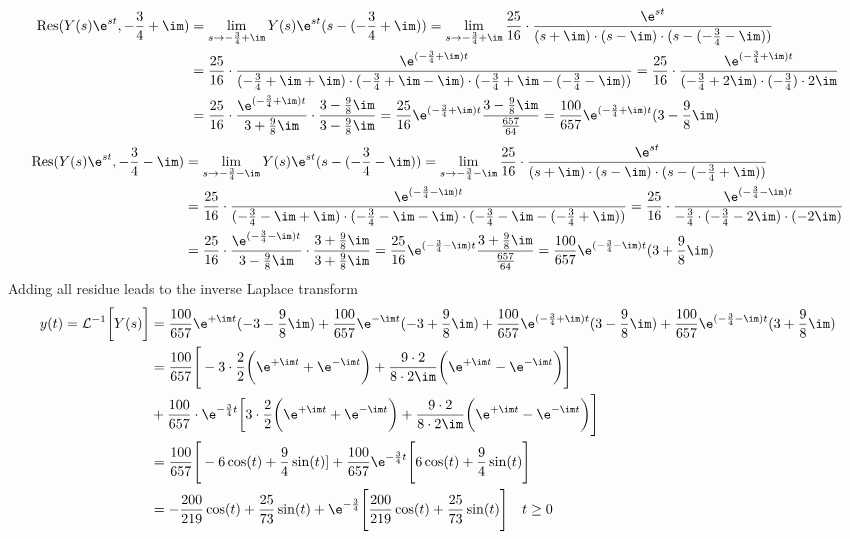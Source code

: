 \begin{align}
	\mathrm{Res}(Y(s)\e^{st},-\frac{3}{4}+\im)&=\lim\limits_{s\rightarrow-\frac{3}{4}+\im}Y(s)\e^{st}(s-(-\frac{3}{4}+\im))=\lim\limits_{s \rightarrow -\frac{3}{4}+\im}\frac{25}{16}\cdot\frac{\e^{st}}{(s+\im)\cdot(s-\im)\cdot(s-(-\frac{3}{4}-\im))} \nonumber \\
	&= \frac{25}{16}\cdot\frac{\e^{(-\frac{3}{4}+\im)t}}{(-\frac{3}{4}+\im+\im)\cdot(-\frac{3}{4}+\im-\im)\cdot(-\frac{3}{4}+\im-(-\frac{3}{4}-\im))}=\frac{25}{16}\cdot\frac{\e^{(-\frac{3}{4}+\im)t}}{(-\frac{3}{4}+2\im)\cdot(-\frac{3}{4})\cdot2\im} \nonumber \\
	&=\frac{25}{16}\cdot\frac{\e^{(-\frac{3}{4}+\im)t}}{3+\frac{9}{8}\im}\cdot\frac{3-\frac{9}{8}\im}{3-\frac{9}{8}\im}=\frac{25}{16}\e^{(-\frac{3}{4}+\im)t}\frac{3-\frac{9}{8}\im}{\frac{657}{64}}= \frac{100}{657}\e^{(-\frac{3}{4}+\im)t}(3-\frac{9}{8}\im)
\end{align}
\begin{align}
	\mathrm{Res}(Y(s)\e^{st},-\frac{3}{4}-\im)&=\lim\limits_{s\rightarrow-\frac{3}{4}-\im}Y(s)\e^{st}(s-(-\frac{3}{4}-\im))=\lim\limits_{s \rightarrow -\frac{3}{4}-\im}\frac{25}{16}\cdot\frac{\e^{st}}{(s+\im)\cdot(s-\im)\cdot(s-(-\frac{3}{4}+\im))} \nonumber \\
	&= \frac{25}{16}\cdot\frac{\e^{(-\frac{3}{4}-\im)t}}{(-\frac{3}{4}-\im+\im)\cdot(-\frac{3}{4}-\im-\im)\cdot(-\frac{3}{4}-\im-(-\frac{3}{4}+\im))}=\frac{25}{16}\cdot\frac{\e^{(-\frac{3}{4}-\im)t}}{-\frac{3}{4}\cdot(-\frac{3}{4}-2\im)\cdot(-2\im)} \nonumber \\
	&=\frac{25}{16}\cdot\frac{\e^{(-\frac{3}{4}-\im)t}}{3-\frac{9}{8}\im}\cdot\frac{3+\frac{9}{8}\im}{3+\frac{9}{8}\im}=\frac{25}{16}\e^{(-\frac{3}{4}-\im)t}\frac{3+\frac{9}{8}\im}{\frac{657}{64}}= \frac{100}{657}\e^{(-\frac{3}{4}-\im)t}(3+\frac{9}{8}\im)
\end{align}
Adding all residue leads to the inverse Laplace transform
\begin{align}
	y(t) = \mathcal{L}^{-1}\bigg [Y(s)\bigg ] &= \frac{100}{657}\e^{+\im t}(-3-\frac{9}{8}\im)+\frac{100}{657}\e^{-\im t}(-3+\frac{9}{8}\im)+\frac{100}{657}\e^{(-\frac{3}{4}+\im)t}(3-\frac{9}{8}\im)+\frac{100}{657}\e^{(-\frac{3}{4}-\im)t}(3+\frac{9}{8}\im)\nonumber \\
	&=\frac{100}{657}\Bigg [-3\cdot\frac{2}{2}\bigg (\e^{+\im t}+\e^{-\im t}\bigg )+\frac{9\cdot 2}{8\cdot2\im}\bigg (\e^{+\im t}-\e^{-\im t}\bigg )\Bigg ]\nonumber \\
	&+\frac{100}{657}\cdot\e^{-\frac{3}{4}t}\bigg [3\cdot\frac{2}{2}\bigg (\e^{+\im t}+\e^{-\im t}\bigg )+\frac{9\cdot2}{8\cdot2\im}\bigg (\e^{+\im t}-\e^{-\im t}\bigg )\Bigg ]\nonumber\\
	&=\frac{100}{657}\Bigg [-6\cos(t)+\frac{9}{4}\sin(t)]+\frac{100}{657}\e^{-\frac{3}{4}t}\Bigg [6\cos(t)+\frac{9}{4}\sin(t)\Bigg ] \nonumber \\
	&= -\frac{200}{219}\cos(t)+\frac{25}{73}\sin(t)+\e^{-\frac{3}{4}}\Bigg [\frac{200}{219}\cos(t)+\frac{25}{73}\sin(t) \Bigg ]\quad t \geq 0
\end{align}
